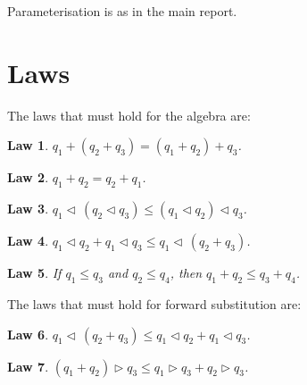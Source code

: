 \documentclass[acmsmall,screen,nonacm]{acmart}
\DeclareMathOperator{\scale}{\mathbin{\triangleleft}}
\DeclareMathOperator{\boxop}{\mathbin{\triangleright}}
\newtheorem{law}{Law}
\begin{document}
Parameterisation is as in the main report.

\section{Laws}

The laws that must hold for the algebra are:

\begin{law}
\label{law:add-assoc}
  $q_1 + (q_2 + q_3) = (q_1 + q_2) + q_3$.
\end{law}

\begin{law}
\label{law:add-comm}
  $q_1 + q_2 = q_2 + q_1$.
\end{law}

\begin{law}
\label{law:mul-assoc-1}
  $q_1 \scale \, (q_2 \scale q_3) \le (q_1 \scale q_2) \scale q_3$.
\end{law}

\begin{law}
\label{law:mul-distr-add-left-1}
  $q_1 \scale q_2 + q_1 \scale q_3 \le q_1 \scale \, (q_2 + q_3)$.
\end{law}


\begin{law}
\label{law:add-mono}
  If $q_1 \le q_3$ and $q_2 \le q_4$, then $q_1 + q_2 \le q_3 + q_4$.
\end{law}


The laws that must hold for forward substitution are:


\begin{law}
\label{law:mul-distr-add-left-2}
  $q_1 \scale \, (q_2 + q_3) \le q_1 \scale q_2 + q_1 \scale q_3$.
\end{law}

\begin{law}
\label{law:mul-distr-add-right-2}
  $(q_1 + q_2) \boxop q_3 \le q_1 \boxop q_3 + q_2 \boxop q_3$.
\end{law}
\end{document}
